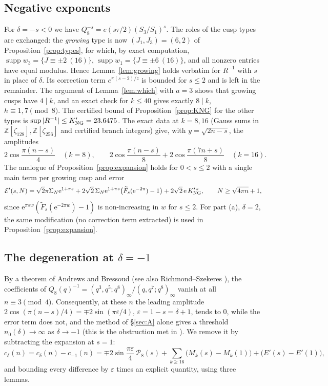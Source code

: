 \documentclass[11pt]{amsart}
\theoremstyle{remark}
\theoremstyle{definition}
\newcommand{\Z}{\mathbb Z}
\newcommand{\cP}{\mathcal P}
\newcommand{\cE}{\mathcal E}
\newcommand{\e}{\mathrm e}
\begin{document}
\subsection{Negative exponents}
For $\delta=-s<0$ we have $Q_8^{-s}=e(s\tau/2)(S_3/S_1)^s$. The roles of the cusp types are exchanged: the \emph{growing} type is now $(J_1,J_3)=(6,2)$ of Proposition~\ref{prop:types}, for which, by exact computation, $\operatorname{supp}w_3=\{J\equiv\pm2\ (16)\}$, $\operatorname{supp}w_1=\{J\equiv\pm6\ (16)\}$, and all nonzero entries have equal modulus. Hence Lemma~\ref{lem:growing} holds verbatim for $R^{-1}$ with $s$ in place of $\delta$. Its correction term $e^{\pi(s-2)/z}$ is bounded for $s\le2$ and is left in the remainder. The argument of Lemma~\ref{lem:which} with $a=3$ shows that growing cusps have $4\mid k$, and an exact check for $k\le40$ gives exactly $8\mid k$, $h\equiv1,7\pmod8$. The certified bound of Proposition~\ref{prop:KNG} for the other types is $\sup|R^{-1}|\le K'_{\rm NG}=23.6475$. The exact data at $k=8,16$ (Gauss sums in $\Z[\zeta_{128}],\Z[\zeta_{256}]$ and certified branch integers) give, with $y=\sqrt{2n-s}$, the amplitudes
\[
2\cos\frac{\pi(n-s)}4\quad(k=8),\qquad 2\cos\frac{\pi(n-s)}8+2\cos\frac{\pi(7n+s)}8\quad(k=16).
\]
The analogue of Proposition~\ref{prop:expansion} holds for $0<s\le2$ with a single main term per growing cusp and error
\[
\cE'(s,N)=\sqrt2\pi\Sigma_N\e^{1+\pi s}+2\sqrt2\,\Sigma_N\e^{1+\pi s}\big(\widetilde F_s(\e^{-2\pi})-1\big)+2\sqrt2\,\e\,K_{\rm NG}'^{\,s},\qquad N\ge\sqrt{4\pi n}+1,
\]
since $\e^{\pi sw}(\widetilde F_s(\e^{-2\pi w})-1)$ is non-increasing in $w$ for $s\le2$. For part (a), $\delta=2$, the same modification (no correction term extracted) is used in Proposition~\ref{prop:expansion}.

\subsection{The degeneration at \texorpdfstring{$\delta=-1$}{delta = -1}}
By a theorem of Andrews and Bressoud \cite{AB} (see also Richmond--Szekeres \cite[Thm.~5.1]{RS}), the coefficients of $Q_8(q)^{-1}=(q^3,q^5;q^8)_\infty/(q,q^7;q^8)_\infty$ vanish at all $n\equiv3\pmod4$. Consequently, at these $n$ the leading amplitude $2\cos(\pi(n-s)/4)=\mp2\sin(\pi\varepsilon/4)$, $\varepsilon=1-s=\delta+1$, tends to $0$, while the error term does not, and the method of \S\ref{sec:A} alone gives a threshold $n_0(\delta)\to\infty$ as $\delta\to-1$ (this is the obstruction met in \cite{HL}). We remove it by subtracting the expansion at $s=1$:
\[
c_\delta(n)=c_\delta(n)-c_{-1}(n)=\mp2\sin\frac{\pi\varepsilon}4\,\cP_8(s)+\sum_{k\ge16}\big(M_k(s)-M_k(1)\big)+\big(E'(s)-E'(1)\big),
\]
and bounding every difference by $\varepsilon$ times an explicit quantity, using three lemmas.
\end{document}
